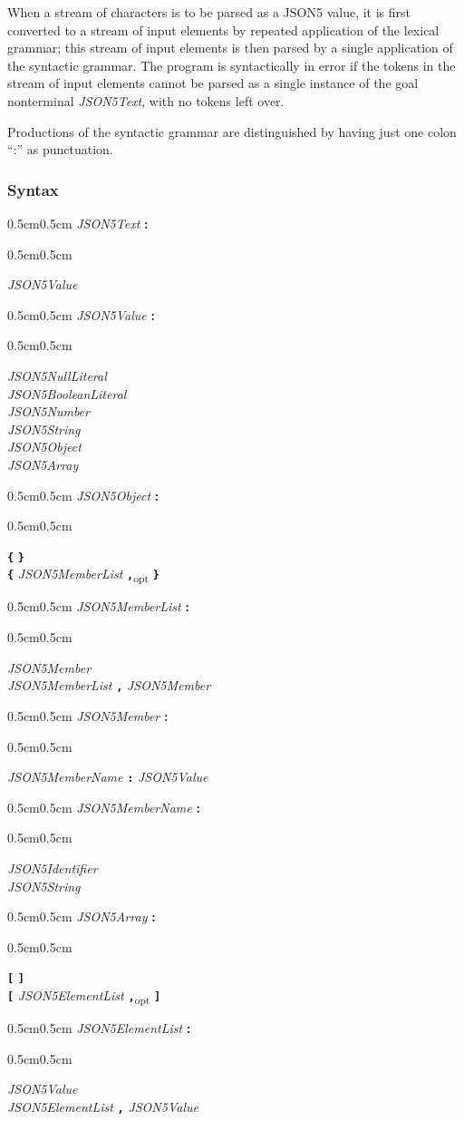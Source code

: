 \documentclass{article}
\newenvironment{gramprod}[2]{
	\begin{samepage}
	\begin{adjustwidth}{0.5cm}{0.5cm}
		\emph{#1} \textbf{#2}
		\begin{adjustwidth}{0.5cm}{0.5cm}
		}{
		\medskip
		\end{adjustwidth}
	\end{adjustwidth}
	\end{samepage}
}
\newenvironment{synprod}[1]{
	\begin{gramprod}{#1}{:}
	}{
	\end{gramprod}
}
\newcommand{\token}[1]{\emph{#1}}
\newcommand{\lit}[1]{\textbf{\texttt{#1}}}
\newcommand{\opt}[1]{#1\textsubscript{opt}}
\begin{document}
When a stream of characters is to be parsed as a JSON5 value, it is first
converted to a stream of input elements by repeated application of the lexical
grammar; this stream of input elements is then parsed by a single application of
the syntactic grammar. The program is syntactically in error if the tokens in
the stream of input elements cannot be parsed as a single instance of the goal
nonterminal \token{JSON5Text}, with no tokens left over.

Productions of the syntactic grammar are distinguished by having just one colon ``:''
as punctuation.

\subsubsection*{Syntax}

\begin{synprod}{JSON5Text}
	\token{JSON5Value}
\end{synprod}

\begin{synprod}{JSON5Value}
	\token{JSON5NullLiteral}\\
	\token{JSON5BooleanLiteral}\\
	\token{JSON5Number}\\
	\token{JSON5String}\\
	\token{JSON5Object}\\
	\token{JSON5Array}
\end{synprod}

\begin{synprod}{JSON5Object}
	\lit{\{} \lit{\}}\\
	\lit{\{} \token{JSON5MemberList} \opt{\lit{,}} \lit{\}}
\end{synprod}

\begin{synprod}{JSON5MemberList}
	\token{JSON5Member}\\
	\token{JSON5MemberList} \lit{,} \token{JSON5Member}
\end{synprod}

\begin{synprod}{JSON5Member}
	\token{JSON5MemberName} \lit{:} \token{JSON5Value}
\end{synprod}

\begin{synprod}{JSON5MemberName}
	\token{JSON5Identifier}\\
	\token{JSON5String}
\end{synprod}

\begin{synprod}{JSON5Array}
	\lit{[} \lit{]}\\
	\lit{[} \token{JSON5ElementList} \opt{\lit{,}} \lit{]}
\end{synprod}

\begin{synprod}{JSON5ElementList}
	\token{JSON5Value}\\
	\token{JSON5ElementList} \lit{,} \token{JSON5Value}
\end{synprod}

\printbibliography
\end{document}
